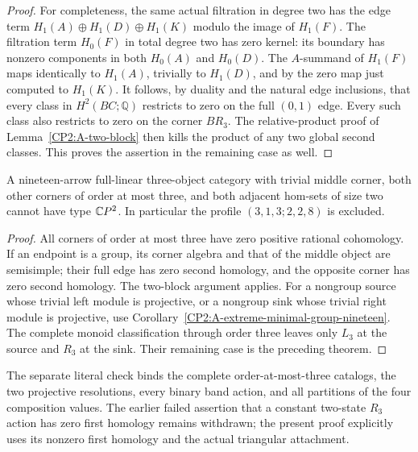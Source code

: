 \begin{proof}
For completeness, the same actual filtration in degree two
has the edge term
$H_1(A)\oplus H_1(D)\oplus H_1(K)$ modulo the image of
$H_1(F)$. The filtration term $H_0(F)$ in total degree two
has zero kernel: its boundary has nonzero components in
both $H_0(A)$ and $H_0(D)$. The $A$-summand of $H_1(F)$
maps identically to $H_1(A)$, trivially to $H_1(D)$, and
by the zero map just computed to $H_1(K)$.
It follows, by duality and the natural edge inclusions, that
every class in $H^2(BC;\mathbb Q)$ restricts to zero on
the full $(0,1)$ edge. Every such class also restricts to
zero on the corner $BR_3$. The relative-product proof of
Lemma~\ref{CP2:A-two-block} then kills the product of any
two global second classes. This proves the assertion in
the remaining case as well.
\end{proof}

\begin{corollary}
\label{CP2:A-small-endpoints-binary-adjacent-nineteen}
A nineteen-arrow full-linear three-object category with
trivial middle corner, both other corners of order at most
three, and both adjacent hom-sets of size two cannot have
type $\mathbb{C}P^2$. In particular the profile
$(3,1,3;2,2,8)$ is excluded.
\end{corollary}
\begin{proof}
All corners of order at most three have zero positive
rational cohomology. If an endpoint is a group, its corner
algebra and that of the middle object are semisimple; their
full edge has zero second homology, and the opposite corner
has zero second homology. The two-block argument applies.
For a nongroup source whose trivial left module is projective,
or a nongroup sink whose trivial right module is projective,
use Corollary~\ref{CP2:A-extreme-minimal-group-nineteen}.
The complete monoid classification through order three
leaves only $L_3$ at the source and $R_3$ at the sink.
Their remaining case is the preceding theorem.
\end{proof}

The separate literal check binds the complete order-at-most-three
catalogs, the two projective resolutions, every binary band action,
and all partitions of the four composition values. The earlier
failed assertion that a constant two-state $R_3$ action has zero
first homology remains withdrawn; the present proof explicitly
uses its nonzero first homology and the actual triangular attachment.
